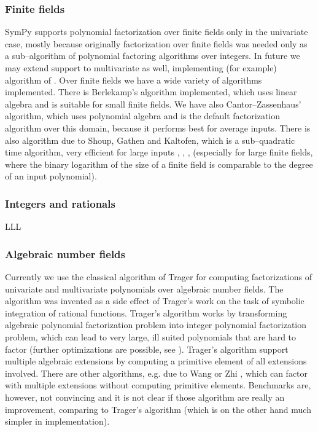 \subsubsection{Finite fields}

SymPy supports polynomial factorization over finite fields only in the univariate case, mostly because
originally factorization over finite fields was needed only as a sub--algorithm of polynomial factoring
algorithms over integers. In future we may extend support to multivariate as well, implementing (for
example) algorithm of \cite{Gathen1983polytime}. Over finite fields we have a wide variety of algorithms
implemented. There is Berlekamp's algorithm implemented, which uses linear algebra and is suitable for
small finite fields. We have also Cantor--Zassenhaus' algorithm, which uses polynomial algebra and is
the default factorization algorithm over this domain, because it performs best for average inputs. There
is also algorithm due to Shoup, Gathen and Kaltofen, which is a sub--quadratic time algorithm, very
efficient for large inputs \cite{Gathen1992frobenious}, \cite{Shoup1993reality}, \cite{Kaltofen1995subquadratic},
\cite{Shoup1995factor} (especially for large finite fields, where the binary logarithm of the size of a
finite field is comparable to the degree of an input polynomial).


\subsubsection{Integers and rationals}

\cite{Musser1975factor}
\cite{Wang1975integers}
\cite{Wang1978improved}

\cite{Lenstra1982factor} LLL
\cite{Abbott2000searching}

\cite{vanHoeij2002knapsack}

\cite{Gao2003partial}


\subsubsection{Algebraic number fields}

Currently we use the classical algorithm of Trager \cite{Trager1976algebraic} for computing factorizations
of univariate and multivariate polynomials over algebraic number fields. The algorithm was invented as
a side effect of Trager's work on the task of symbolic integration of rational functions. Trager's
algorithm works by transforming algebraic polynomial factorization problem into integer polynomial
factorization problem, which can lead to very large, ill suited polynomials that are hard to factor
(further optimizations are possible, see \cite{Encarnacion1997norms}). Trager's algorithm support multiple
algebraic extensions by computing a primitive element of all extensions involved. There are other
algorithms, e.g. due to Wang \cite{Wang1976algebraic} or Zhi \cite{Zhi1997optimal}, which can factor with
multiple extensions without computing primitive elements. Benchmarks are, however, not convincing
and it is not clear if those algorithm are really an improvement, comparing to Trager's algorithm
(which is on the other hand much simpler in implementation).


